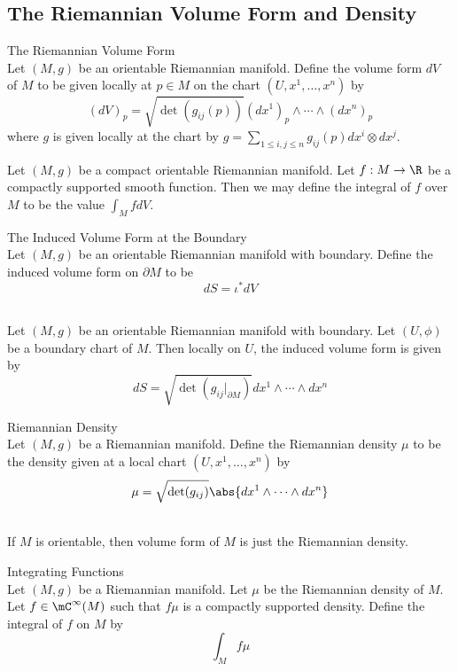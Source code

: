 \documentclass[a4paper]{article}
\begin{document}
\subsection{The Riemannian Volume Form and Density}
\begin{defn}{The Riemannian Volume Form}{}\\
Let $(M,g)$ be an orientable Riemannian manifold. Define the volume form $dV$ of $M$ to be given locally at $p\in M$ on the chart $(U,x^1,\dots,x^n)$ by $$(dV)_p=\sqrt{\det(g_{ij}(p))}(dx^1)_p\wedge\cdots\wedge(dx^n)_p$$ where $g$ is given locally at the chart by $g=\sum_{1\leq i,j\leq n}g_{ij}(p)dx^i\otimes dx^j$. 
\end{defn}

Let $(M,g)$ be a compact orientable Riemannian manifold. Let $f:M\to\R$ be a compactly supported smooth function. Then we may define the integral of $f$ over $M$ to be the value $\int_MfdV$. 

\begin{defn}{The Induced Volume Form at the Boundary}{}\\
Let $(M,g)$ be an orientable Riemannian manifold with boundary. Define the induced volume form on $\partial M$ to be $$dS=\iota^\ast dV$$
\end{defn}

\begin{lmm}{}{}\\
Let $(M,g)$ be an orientable Riemannian manifold with boundary. Let $(U,\phi)$ be a boundary chart of $M$. Then locally on $U$, the induced volume form is given by $$dS=\sqrt{\det(g_{ij}|_{\partial M})}dx^1\wedge\cdots\wedge dx^n$$
\end{lmm}

\begin{defn}{Riemannian Density}{}\\
Let $(M,g)$ be a Riemannian manifold. Define the Riemannian density $\mu$ to be the density given at a local chart $(U,x^1,\dots,x^n)$ by $$\mu=\sqrt{\det(g_{ij})}\abs{dx^1\wedge\cdots\wedge dx^n}$$
\end{defn}

\begin{prp}{}{}\\
If $M$ is orientable, then volume form of $M$ is just the Riemannian density. 
\end{prp}

\begin{defn}{Integrating Functions}{}\\
Let $(M,g)$ be a Riemannian manifold. Let $\mu$ be the Riemannian density of $M$. Let $f\in\mC^\infty(M)$ such that $f\mu$ is a compactly supported density. Define the integral of $f$ on $M$ by $$\int_Mf\mu$$
\end{defn}
\end{document}
